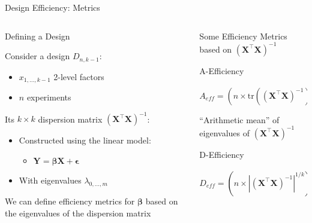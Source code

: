 \documentclass[10pt, compress, aspectratio=169, xcolor={table,usenames,dvipsnames}]{beamer}
\begin{document}
\begin{frame}[label={sec:orgbace3c5}]{Design Efficiency: Metrics}
\addtocounter{framenumber}{-1}
\begin{columns}
\begin{column}{0.5\columnwidth}
\begin{block}{Defining a Design}
\vspace{.2cm}

Consider a design \(D_{n, k - 1}\):

\begin{itemize}
\item \(x_{1, \dots, k - 1}\) \alert{2-level factors}
\item \(n\) \alert{experiments}
\end{itemize}

Its \(k \times k\) \alert{dispersion matrix}
\(\left(\bm{X}^{\intercal}\bm{X}\right)^{-1}\):

\begin{itemize}
\item Constructed using the \alert{linear model}:
\begin{itemize}
\item \(\bm{Y} = \bm{\beta{}X} + \bm{\epsilon}\)
\end{itemize}
\item With \alert{eigenvalues} \(\lambda_{0,...,m}\)
\end{itemize}

We can define \alert{efficiency metrics} for \(\bm{\beta}\) based on the
\alert{eigenvalues} of the \alert{dispersion matrix}
\end{block}
\end{column}

\begin{column}{0.5\columnwidth}
\begin{block}{Some Efficiency Metrics based on \(\left(\bm{X}^{\intercal}\bm{X}\right)^{-1}\)}
\vspace{.2cm}
\begin{block}{A-Efficiency}
\vspace{-.6cm}
\begin{center}
\begin{equation*}
A_{eff} = \left(n \times \text{tr}\left(\left(\bm{X}^{\intercal}\bm{X}\right)^{-1}\right)/k\right)^{-1}, \; A_{eff} \in \left[0, 1\right]
\end{equation*}
\end{center}

\vspace{-.3cm}
\colorbox{Accent!25}{``Arithmetic mean'' of eigenvalues of \(\left(\bm{X}^{\intercal}\bm{X}\right)^{-1}\)}
\end{block}
\begin{block}{D-Efficiency}
\vspace{-.6cm}
\begin{center}
\begin{equation*}
D_{eff} = \left(n \times \left|\left(\bm{X}^{\intercal}\bm{X}\right)^{-1}\right|^{1/k}\right)^{-1}, \; D_{eff} \in \left[0, 1\right]
\end{equation*}
\end{center}


\end{block}
\end{block}
\end{column}
\end{columns}
\end{frame}
\end{document}
